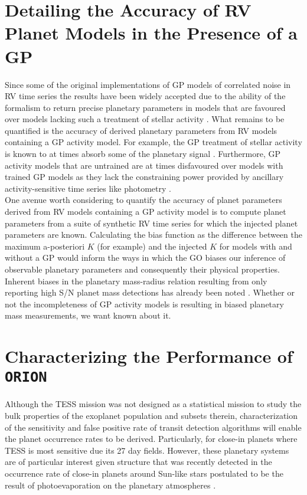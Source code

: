 \section{Detailing the Accuracy of RV Planet Models in the Presence of a GP}
Since some of the original implementations of GP models of correlated noise in
RV time series the results have been widely accepted due to the ability of the
formalism to return precise planetary parameters in models that are favoured
over models lacking such a treatment of stellar activity
\citep{haywood14,rajpaul15}. What remains to be quantified is the accuracy of
derived planetary parameters from RV models containing a GP activity model. For
example, the GP treatment of stellar activity is known to at times absorb some
of the planetary signal \citep[e.g.][]{ribas18}. Furthermore, GP activity models
that are untrained are at times disfavoured over models with trained GP models
as they lack the
constraining power provided by ancillary activity-sensitive time series like
photometry \citep{cloutier17b}. \\

One avenue worth considering to quantify the accuracy of planet parameters
derived from
RV models containing a GP activity model is to compute planet parameters
from a suite of synthetic RV time series for which the injected planet
parameters are known. Calculating the bias function as the difference between
the maximum a-posteriori $K$ (for example) and the injected $K$ for models with
and without a GP would inform the ways in which the GO biases our inference of
observable planetary parameters and consequently their physical properties.
Inherent biases in the planetary mass-radius relation resulting from only
reporting high S/N planet mass detections has already been noted \citep{burt18}.
Whether or not the incompleteness of GP activity models is resulting in biased
planetary mass measurements, we want known about it.


\section{Characterizing the Performance of \texttt{ORION}}
Although the TESS mission was not designed as a statistical mission to study
the bulk properties of the exoplanet population and subsets therein,
characterization of the sensitivity and false positive rate of transit detection
algorithms will enable the planet occurrence rates to be derived. Particularly,
for close-in planets where TESS is most sensitive due its 27 day fields.
However, these planetary systems are of particular interest given structure
that was recently detected in the occurrence rate of close-in planets around
Sun-like stars postulated to be the result of photoevaporation on the planetary
atmospheres \cite{owen13,fulton17,vaneylen18}. \\

